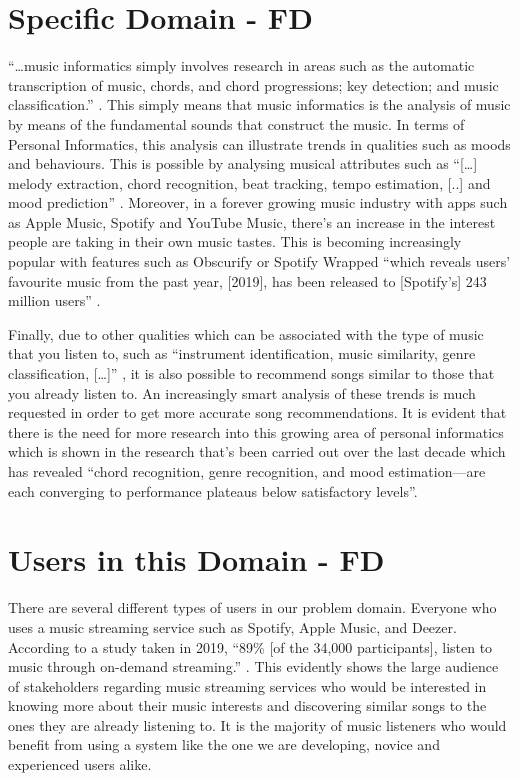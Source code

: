 \documentclass[11pt]{report}
\begin{document}
\section{Specific Domain -  FD}

“…music informatics simply involves research in areas such as the automatic transcription of music, chords, and chord progressions; key detection; and music classification.” \cite{Paas2013}. This simply means that music informatics is the analysis of music by means of the fundamental sounds that construct the music. In terms of Personal Informatics, this analysis can illustrate trends in qualities such as moods and behaviours. This is possible by analysing musical attributes such as “[…] melody extraction, chord recognition, beat tracking, tempo estimation, [..] and mood prediction” \cite{Humphrey2013}.
Moreover, in a forever growing music industry with apps such as Apple Music, Spotify and YouTube Music, there’s an increase in the interest people are taking in their own music tastes. This is becoming increasingly popular with features such as Obscurify or Spotify Wrapped “which reveals users’ favourite music from the past year, [2019], has been released to [Spotify’s] 243 million users” \cite{Izzard2019}.

Finally, due to other qualities which can be associated with the type of music that you listen to, such as “instrument identification, music similarity, genre classification, […]” \cite{Humphrey2013}, it is also possible to recommend songs similar to those that you already listen to. An increasingly smart analysis of these trends is much requested in order to get more accurate song recommendations. It is evident that there is the need for more research into this growing area of personal informatics which is shown in the research that’s been carried out over the last decade which has revealed “chord recognition, genre recognition, and mood estimation—are each converging to performance plateaus below satisfactory levels”\cite{Humphrey2013}.

\section{Users in this Domain - FD}

There are several different types of users in our problem domain. Everyone who uses a music streaming service such as Spotify, Apple Music, and Deezer. According to a study taken in 2019, “89\% [of the 34,000 participants], listen to music through on-demand streaming.” \cite{IFPI2019}. This evidently shows the large audience of stakeholders regarding music streaming services who would be interested in knowing more about their music interests and discovering similar songs to the ones they are already listening to. It is the majority of music listeners who would benefit from using a system like the one we are developing, novice and experienced users alike.
\end{document}
